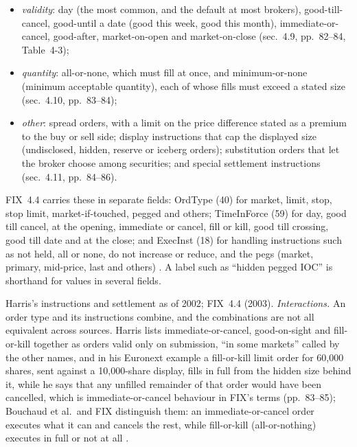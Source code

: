 \begin{qfdefinition}
\begin{itemize}
\item \emph{validity}: day (the most common, and the default at most brokers), good-till-cancel, good-until a date (good this week, good this month), immediate-or-cancel, good-after, market-on-open and market-on-close (sec.~4.9, pp.~82--84, Table~4-3);
\item \emph{quantity}: all-or-none, which must fill at once, and minimum-or-none (minimum acceptable quantity), each of whose fills must exceed a stated size (sec.~4.10, pp.~83--84);
\item \emph{other}: spread orders, with a limit on the price difference stated as a premium to the buy or sell side; display instructions that cap the displayed size (undisclosed, hidden, reserve or iceberg orders); substitution orders that let the broker choose among securities; and special settlement instructions (sec.~4.11, pp.~84--86).
\end{itemize}

 FIX~4.4 carries these in separate fields: OrdType (40) for market, limit, stop, stop limit, market-if-touched, pegged and others; TimeInForce (59) for day, good till cancel, at the opening, immediate or cancel, fill or kill, good till crossing, good till date and at the close; and ExecInst (18) for handling instructions such as not held, all or none, do not increase or reduce, and the pegs (market, primary, mid-price, last and others) \citep[OrdType, TimeInForce and ExecInst code sets, FIX.4.4\_EP311]{fix44-orchestra}. A label such as ``hidden pegged IOC'' is shorthand for values in several fields.

 Harris's instructions and settlement as of 2002; FIX~4.4 (2003). \emph{Interactions.} An order type and its instructions combine, and the combinations are not all equivalent across sources. Harris lists immediate-or-cancel, good-on-sight and fill-or-kill together as orders valid only on submission, ``in some markets'' called by the other names, and in his Euronext example a fill-or-kill limit order for 60{,}000 shares, sent against a 10{,}000-share display, fills in full from the hidden size behind it, while he says that any unfilled remainder of that order would have been cancelled, which is immediate-or-cancel behaviour in FIX's terms (pp.~83--85); Bouchaud et al.\ and FIX distinguish them: an immediate-or-cancel order executes what it can and cancels the rest, while fill-or-kill (all-or-nothing) executes in full or not at all \citep[chap.~3, sec.~3.2.2, p.~55]{catalogue-0528}.


\end{qfdefinition}
